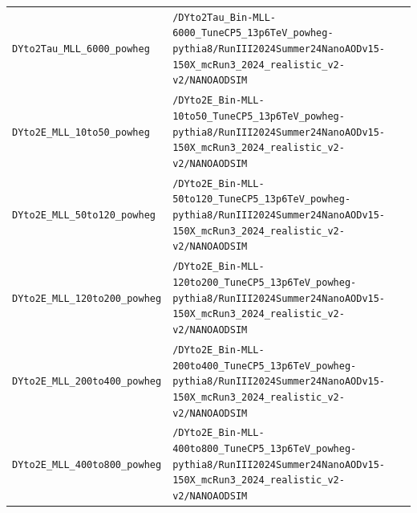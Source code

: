 \begin{longtable}{@{}>{\RaggedRight\arraybackslash}p{} >{\RaggedRight\arraybackslash}p{}@{}}
\addlinespace[2pt]
\texttt{DYto2Tau\_\allowbreak{}MLL\_\allowbreak{}6000\_\allowbreak{}powheg} & \texttt{/\allowbreak{}DYto2Tau\_\allowbreak{}Bin-\allowbreak{}MLL-\allowbreak{}6000\_\allowbreak{}TuneCP5\_\allowbreak{}13p6TeV\_\allowbreak{}powheg-\allowbreak{}pythia8/\allowbreak{}RunIII2024Summer24NanoAODv15-\allowbreak{}150X\_\allowbreak{}mcRun3\_\allowbreak{}2024\_\allowbreak{}realistic\_\allowbreak{}v2-\allowbreak{}v2/\allowbreak{}NANOAODSIM} \\
\addlinespace[2pt]
\texttt{DYto2E\_\allowbreak{}MLL\_\allowbreak{}10to50\_\allowbreak{}powheg} & \texttt{/\allowbreak{}DYto2E\_\allowbreak{}Bin-\allowbreak{}MLL-\allowbreak{}10to50\_\allowbreak{}TuneCP5\_\allowbreak{}13p6TeV\_\allowbreak{}powheg-\allowbreak{}pythia8/\allowbreak{}RunIII2024Summer24NanoAODv15-\allowbreak{}150X\_\allowbreak{}mcRun3\_\allowbreak{}2024\_\allowbreak{}realistic\_\allowbreak{}v2-\allowbreak{}v2/\allowbreak{}NANOAODSIM} \\
\addlinespace[2pt]
\texttt{DYto2E\_\allowbreak{}MLL\_\allowbreak{}50to120\_\allowbreak{}powheg} & \texttt{/\allowbreak{}DYto2E\_\allowbreak{}Bin-\allowbreak{}MLL-\allowbreak{}50to120\_\allowbreak{}TuneCP5\_\allowbreak{}13p6TeV\_\allowbreak{}powheg-\allowbreak{}pythia8/\allowbreak{}RunIII2024Summer24NanoAODv15-\allowbreak{}150X\_\allowbreak{}mcRun3\_\allowbreak{}2024\_\allowbreak{}realistic\_\allowbreak{}v2-\allowbreak{}v2/\allowbreak{}NANOAODSIM} \\
\addlinespace[2pt]
\texttt{DYto2E\_\allowbreak{}MLL\_\allowbreak{}120to200\_\allowbreak{}powheg} & \texttt{/\allowbreak{}DYto2E\_\allowbreak{}Bin-\allowbreak{}MLL-\allowbreak{}120to200\_\allowbreak{}TuneCP5\_\allowbreak{}13p6TeV\_\allowbreak{}powheg-\allowbreak{}pythia8/\allowbreak{}RunIII2024Summer24NanoAODv15-\allowbreak{}150X\_\allowbreak{}mcRun3\_\allowbreak{}2024\_\allowbreak{}realistic\_\allowbreak{}v2-\allowbreak{}v2/\allowbreak{}NANOAODSIM} \\
\addlinespace[2pt]
\texttt{DYto2E\_\allowbreak{}MLL\_\allowbreak{}200to400\_\allowbreak{}powheg} & \texttt{/\allowbreak{}DYto2E\_\allowbreak{}Bin-\allowbreak{}MLL-\allowbreak{}200to400\_\allowbreak{}TuneCP5\_\allowbreak{}13p6TeV\_\allowbreak{}powheg-\allowbreak{}pythia8/\allowbreak{}RunIII2024Summer24NanoAODv15-\allowbreak{}150X\_\allowbreak{}mcRun3\_\allowbreak{}2024\_\allowbreak{}realistic\_\allowbreak{}v2-\allowbreak{}v2/\allowbreak{}NANOAODSIM} \\
\addlinespace[2pt]
\texttt{DYto2E\_\allowbreak{}MLL\_\allowbreak{}400to800\_\allowbreak{}powheg} & \texttt{/\allowbreak{}DYto2E\_\allowbreak{}Bin-\allowbreak{}MLL-\allowbreak{}400to800\_\allowbreak{}TuneCP5\_\allowbreak{}13p6TeV\_\allowbreak{}powheg-\allowbreak{}pythia8/\allowbreak{}RunIII2024Summer24NanoAODv15-\allowbreak{}150X\_\allowbreak{}mcRun3\_\allowbreak{}2024\_\allowbreak{}realistic\_\allowbreak{}v2-\allowbreak{}v2/\allowbreak{}NANOAODSIM} \\

\end{longtable}
